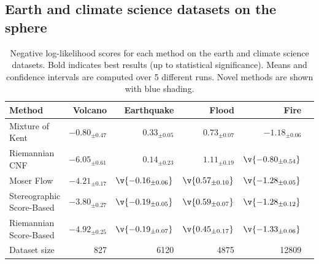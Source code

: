 \subsection{Earth and climate science datasets on the sphere}
\label{sec:exp_sphere}
\begin{table}[t]
	\centering
	\small
	\begin{tabular}{lrrrrr}
		\toprule
		Method                    & {Volcano}                               & {Earthquake}                              & {Flood}                                  & {Fire}                                    \\
		\midrule
		Mixture of Kent           & $-0.80_{\pm 0.47}$                      & $0.33_{\pm 0.05}$                         & $0.73_{\pm 0.07}$                        & $-1.18_{\pm 0.06}$                        \\
		Riemannian CNF            & $\bm{-6.05_{\pm 0.61}}$                 & ${0.14_{\pm 0.23}}$                       & ${1.11_{\pm 0.19}}$                      & $\v{-0.80_{\pm 0.54}}$                    \\
		Moser Flow                & ${-4.21_{\pm 0.17}}$                    & $\v{-0.16_{\pm 0.06}}$                    & $\v{0.57_{\pm 0.10}}$                    & $\v{-1.28_{\pm 0.05}}$                    \\
		Stereographic Score-Based & \cellcolor{blue!20}${-3.80_{\pm 0.27}}$ & \cellcolor{blue!20}$\v{-0.19_{\pm 0.05}}$ & \cellcolor{blue!20}$\v{0.59_{\pm 0.07}}$ & \cellcolor{blue!20}$\v{-1.28_{\pm 0.12}}$ \\
		Riemannian Score-Based    & \cellcolor{blue!20}${-4.92_{\pm 0.25}}$ & \cellcolor{blue!20}$\v{-0.19_{\pm 0.07}}$ & \cellcolor{blue!20}$\v{0.45_{\pm 0.17}}$ & \cellcolor{blue!20}$\v{-1.33_{\pm 0.06}}$ \\
		\midrule
		Dataset size              & 827                                     & 6120                                      & 4875                                     & 12809                                     \\
		\bottomrule
	\end{tabular}
	\caption{
		Negative log-likelihood scores for each method on the earth and climate science datasets.
		Bold indicates best results (up to statistical significance).
		Means and confidence intervals are computed over 5 different runs.
		Novel methods are shown with blue shading.
	}
	\label{tab:geoscience}
\end{table}


